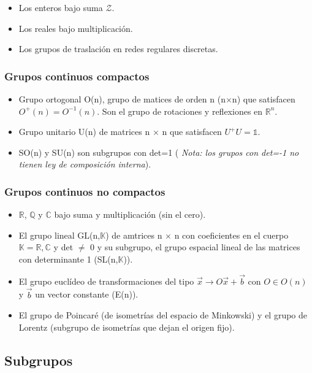 \documentclass{article}
\begin{document}
\begin{itemize}
    \item Los enteros bajo suma $\mathcal{Z}$.
    \item Los reales bajo multiplicación.
    \item Los grupos de traslación en redes regulares discretas.
\end{itemize}

\subsubsection{Grupos continuos compactos}
\begin{itemize}
    \item Grupo ortogonal O(n), grupo de matices de orden n (n$\times$n) que satisfacen $O^+(n)=O^{-1}(n)$. Son el grupo de rotaciones y reflexiones en $\mathds{R}^n$.
    \item Grupo unitario U(n) de matrices n $\times$ n que satisfacen $U^+U=\mathds{1}$.
    \item SO(n) y SU(n) son subgrupos con det=1 (\textit{ Nota: los grupos con det=-1 no tienen ley de composición interna}).
\end{itemize}

\subsubsection{Grupos continuos no compactos}

\begin{itemize}
    \item $\mathds{R}$, $\mathds{Q}$ y $\mathds{C}$ bajo suma y multiplicación (sin el cero).
    \item El grupo lineal GL(n,$\mathds{K}$) de amtrices n $\times$ n con coeficientes en el cuerpo $\mathds{K}=\mathds{R},\mathds{C}$ y det $\neq$ 0 y su subgrupo, el grupo espacial lineal de las matrices con determinante 1 (SL(n,$\mathds{K}$)).
    \item El grupo euclídeo de transformaciones del tipo $\Vec{x}\rightarrow O\Vec{x}+\Vec{b}$ con $O\in O(n)$ y $\Vec{b}$ un vector constante (E(n)).
    \item El grupo de Poincaré (de isometrías del espacio de Minkowski) y el grupo de Lorentz (subgrupo de isometrías que dejan el origen fijo).
\end{itemize}

\subsection{Subgrupos}
\end{document}
